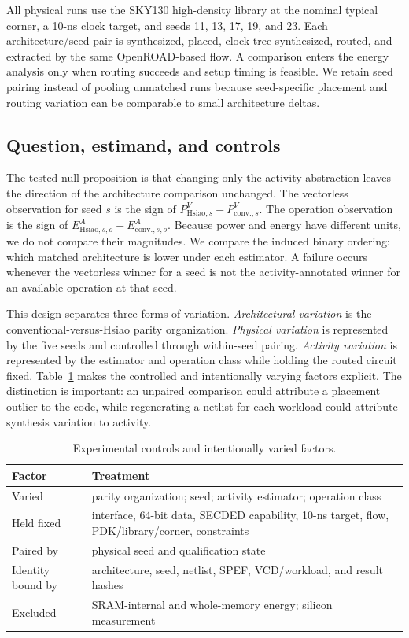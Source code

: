\documentclass[conference,10pt]{IEEEtran}
\begin{document}
All physical runs use the SKY130 high-density library at the nominal typical corner, a 10-ns clock target, and seeds 11, 13, 17, 19, and 23. Each architecture/seed pair is synthesized, placed, clock-tree synthesized, routed, and extracted by the same OpenROAD-based flow. A comparison enters the energy analysis only when routing succeeds and setup timing is feasible. We retain seed pairing instead of pooling unmatched runs because seed-specific placement and routing variation can be comparable to small architecture deltas.

\subsection{Question, estimand, and controls}
The tested null proposition is that changing only the activity abstraction leaves the direction of the architecture comparison unchanged. The vectorless observation for seed $s$ is the sign of $P^{V}_{\mathrm{Hsiao},s}-P^{V}_{\mathrm{conv.},s}$. The operation observation is the sign of $E^{A}_{\mathrm{Hsiao},s,o}-E^{A}_{\mathrm{conv.},s,o}$. Because power and energy have different units, we do not compare their magnitudes. We compare the induced binary ordering: which matched architecture is lower under each estimator. A failure occurs whenever the vectorless winner for a seed is not the activity-annotated winner for an available operation at that seed.

This design separates three forms of variation. \emph{Architectural variation} is the conventional-versus-Hsiao parity organization. \emph{Physical variation} is represented by the five seeds and controlled through within-seed pairing. \emph{Activity variation} is represented by the estimator and operation class while holding the routed circuit fixed. Table~\ref{tab:controls} makes the controlled and intentionally varying factors explicit. The distinction is important: an unpaired comparison could attribute a placement outlier to the code, while regenerating a netlist for each workload could attribute synthesis variation to activity.

\begin{table}[t]
\caption{Experimental controls and intentionally varied factors.}
\label{tab:controls}
\centering\footnotesize
\setlength{\tabcolsep}{3.2pt}
\begin{tabular}{p{}p{}}
\toprule
Factor & Treatment \\
\midrule
Varied & parity organization; seed; activity estimator; operation class \\
Held fixed & interface, 64-bit data, SECDED capability, 10-ns target, flow, PDK/library/corner, constraints \\
Paired by & physical seed and qualification state \\
Identity bound by & architecture, seed, netlist, SPEF, VCD/workload, and result hashes \\
Excluded & SRAM-internal and whole-memory energy; silicon measurement \\
\bottomrule
\end{tabular}
\end{table}
\end{document}
